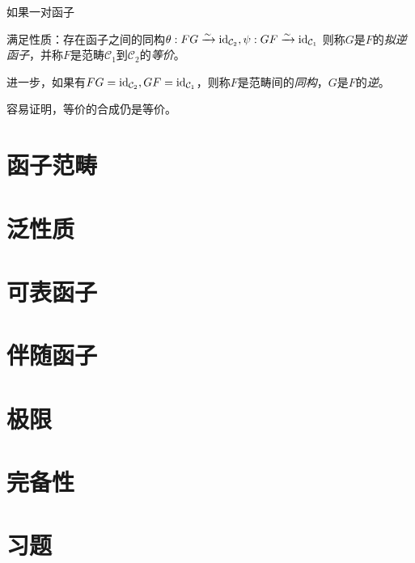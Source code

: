 \begin{Def}[等价]如果一对函子
    满足性质：存在函子之间的同构$\theta:FG\xrightarrow{\sim}\mathrm{id}_{\mathcal{C}_2}, \psi:GF\xrightarrow{\sim}\mathrm{id}_{\mathcal{C}_1}$
    则称$G$是$F$的\emph{拟逆函子}，并称$F$是范畴$\mathcal{C}_1$到$\mathcal{C}_2$的\emph{等价}。
    
    进一步，如果有$FG=\mathrm{id}_{\mathcal{C}_2},GF=\mathrm{id}_{\mathcal{C}_1}$，则称$F$是范畴间的\emph{同构}，$G$是$F$的\emph{逆}。

    容易证明，等价的合成仍是等价。
\end{Def}
\section{函子范畴}
\section{泛性质}
\section{可表函子}
\section{伴随函子}
\section{极限}
\section{完备性}
\section{习题}
